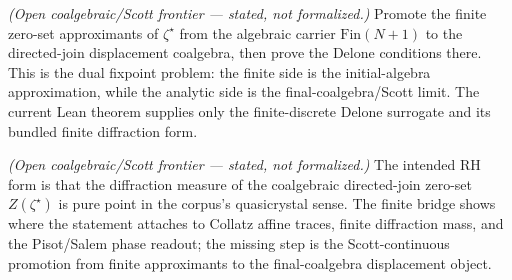 \begin{theorem}
  \label{thm:zeta-star-analytic-delone}
  \notready
  \emph{(Open coalgebraic/Scott frontier --- stated, not formalized.)} Promote
  the finite zero-set approximants of \(\zeta^\star\) from the algebraic carrier
  \(\mathrm{Fin}(N+1)\) to the directed-join displacement coalgebra, then prove
  the Delone conditions there.  This is the dual fixpoint problem: the finite
  side is the initial-algebra approximation, while the analytic side is the
  final-coalgebra/Scott limit.  The current Lean theorem supplies only the
  finite-discrete Delone surrogate and its bundled finite diffraction form.
\end{theorem}

\begin{theorem}
  \label{thm:zeta-star-rh-pure-point}
  \notready
  \emph{(Open coalgebraic/Scott frontier --- stated, not formalized.)} The
  intended RH form is that the diffraction measure of the coalgebraic
  directed-join zero-set \(Z(\zeta^\star)\) is pure point in the corpus's
  quasicrystal sense.  The finite bridge shows where the statement attaches to
  Collatz affine traces, finite diffraction mass, and the Pisot/Salem phase
  readout; the missing step is the Scott-continuous promotion from finite
  approximants to the final-coalgebra displacement object.
\end{theorem}
